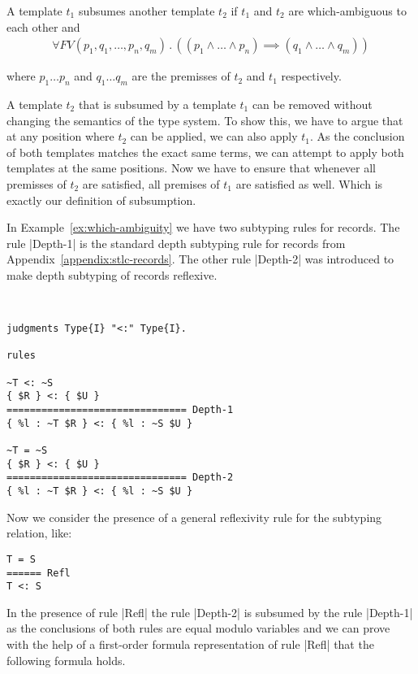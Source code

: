 \begin{definition}
  A template $t_1$ subsumes another template $t_2$ if $t_1$ and $t_2$
  are which-ambiguous to each other and
  \begin{align}
    \forall FV(p_1,q_1,\dots, p_n,q_m) \,.\, ((p_1 \land\dots\land
    p_n) \implies (q_1 \land\dots\land q_m))
  \end{align}

  where $p_1 \dots p_n$ and $q_1 \dots q_m$ are the premisses of $t_2$
  and $t_1$ respectively.
\label{def:subsumes}
\end{definition}

A template $t_2$ that is subsumed by a template $t_1$ can be removed
without changing the semantics of the type system. To show this, we
have to argue that at any position where $t_2$ can be applied, we can
also apply $t_1$. As the conclusion of both templates matches the
exact same terms, we can attempt to apply both templates at the same
positions. Now we have to ensure that whenever all premisses of $t_2$
are satisfied, all premises of $t_1$ are satisfied as well. Which is
exactly our definition of subsumption.

In Example~\ref{ex:which-ambiguity} we have two subtyping rules for
records. The rule \code|Depth-1| is the standard depth subtyping rule
for records from Appendix~\ref{appendix:stlc-records}. The other rule
\code|Depth-2| was introduced to make depth subtyping of records
reflexive.

\begin{example}{~}
\begin{lstlisting}[language=sltc]
judgments Type{I} "<:" Type{I}.

rules

~T <: ~S
{ $R } <: { $U }
=============================== Depth-1
{ %l : ~T $R } <: { %l : ~S $U }

~T = ~S
{ $R } <: { $U }
=============================== Depth-2
{ %l : ~T $R } <: { %l : ~S $U }
\end{lstlisting}
\label{ex:which-ambiguity}
\end{example}

Now we consider the presence of a general reflexivity rule for the
subtyping relation, like:

\begin{lstlisting}
T = S
====== Refl
T <: S
\end{lstlisting}

In the presence of rule \code|Refl| the rule \code|Depth-2| is
subsumed by the rule \code|Depth-1| as the conclusions of both rules
are equal modulo variables and we can prove with the help of a
first-order formula representation of rule \code|Refl| that the
following formula holds.


